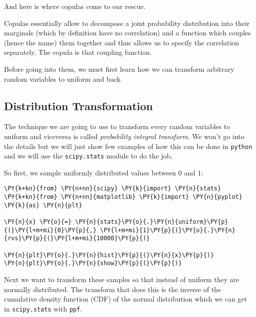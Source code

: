 And here is where copulas come to our rescue.

Copulas essentially allow to decompose a joint probability distribution
into their marginals (which by definition have no correlation) and a
function which couples (hence the name) them together and thus allows us
to specify the correlation separately. The copula is that coupling
function.

Before going into them, we must first learn how we can transform
arbitrary random variables to uniform and back.

\subsection{Distribution
Transformation}\label{distribution-transformation}

The technique we are going to use to transform every random variables to
uniform and viceversa is called \emph{probability integral transform}.
We won't go into the details but we will just show few examples of how
this can be done in \texttt{python} and we will use the
\texttt{scipy.stats} module to do the job.

So first, we sample uniformly distributed values between 0 and 1:

    \begin{tcolorbox}[breakable, size=fbox, boxrule=1pt, pad at break*=1mm,colback=cellbackground, colframe=cellborder]
\begin{Verbatim}[commandchars=\\\{\}]
\PY{k+kn}{from} \PY{n+nn}{scipy} \PY{k}{import} \PY{n}{stats}
\PY{k+kn}{from} \PY{n+nn}{matplotlib} \PY{k}{import} \PY{n}{pyplot} \PY{k}{as} \PY{n}{plt}

\PY{n}{x} \PY{o}{=} \PY{n}{stats}\PY{o}{.}\PY{n}{uniform}\PY{p}{(}\PY{l+m+mi}{0}\PY{p}{,} \PY{l+m+mi}{1}\PY{p}{)}\PY{o}{.}\PY{n}{rvs}\PY{p}{(}\PY{l+m+mi}{10000}\PY{p}{)}

\PY{n}{plt}\PY{o}{.}\PY{n}{hist}\PY{p}{(}\PY{n}{x}\PY{p}{)}
\PY{n}{plt}\PY{o}{.}\PY{n}{show}\PY{p}{(}\PY{p}{)}
\end{Verbatim}
\end{tcolorbox}

    
Next we want to transform these samples so that instead of uniform they
are normally distributed. The transform that does this is the inverse of
the cumulative density function (CDF) of the normal distribution which
we can get in \texttt{scipy.stats} with \texttt{ppf}.

